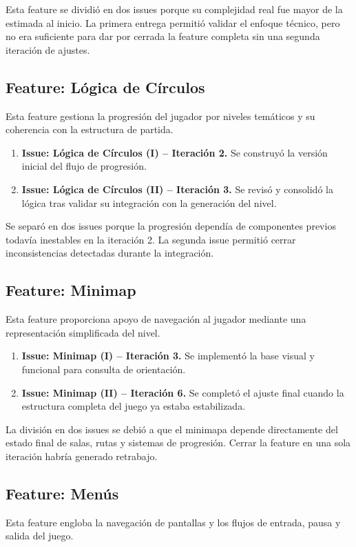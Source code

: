 Esta feature se dividió en dos issues porque su complejidad real fue mayor de la estimada al inicio.
La primera entrega permitió validar el enfoque técnico, pero no era suficiente para dar por cerrada
la feature completa sin una segunda iteración de ajustes.

\subsection{Feature: Lógica de Círculos}
Esta feature gestiona la progresión del jugador por niveles temáticos y su coherencia con la estructura
de partida.

\begin{enumerate}
\item \textbf{Issue: Lógica de Círculos (I) -- Iteración 2.} Se construyó la versión inicial del flujo de progresión.
\item \textbf{Issue: Lógica de Círculos (II) -- Iteración 3.} Se revisó y consolidó la lógica tras validar su integración con la generación del nivel.
\end{enumerate}

Se separó en dos issues porque la progresión dependía de componentes previos todavía inestables en la
iteración 2. La segunda issue permitió cerrar inconsistencias detectadas durante la integración.

\subsection{Feature: Minimap}
Esta feature proporciona apoyo de navegación al jugador mediante una representación simplificada del nivel.

\begin{enumerate}
\item \textbf{Issue: Minimap (I) -- Iteración 3.} Se implementó la base visual y funcional para consulta de orientación.
\item \textbf{Issue: Minimap (II) -- Iteración 6.} Se completó el ajuste final cuando la estructura completa del juego ya estaba estabilizada.
\end{enumerate}

La división en dos issues se debió a que el minimapa depende directamente del estado final de salas,
rutas y sistemas de progresión. Cerrar la feature en una sola iteración habría generado retrabajo.

\subsection{Feature: Menús}
Esta feature engloba la navegación de pantallas y los flujos de entrada, pausa y salida del juego.

